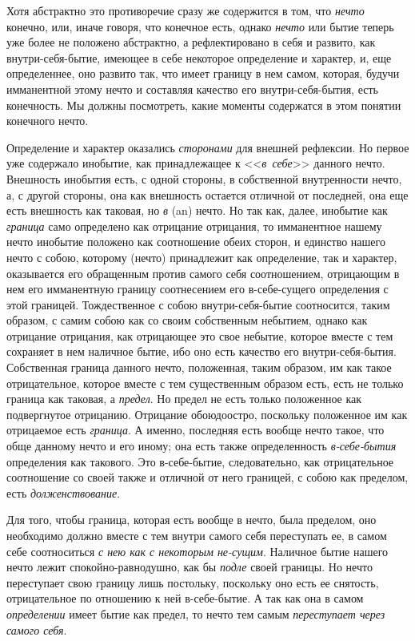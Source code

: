 \bigskip


Хотя абстрактно это противоречие сразу же содержится в том, что
{\em нечто} конечно, или, иначе говоря, что конечное
есть, однако {\em нечто} или бытие теперь уже более не
положено абстрактно, а рефлектировано в себя и развито, как
внутри-себя-бытие, имеющее в себе некоторое определение и характер, и, еще
определеннее, оно развито так, что имеет границу в нем самом, которая,
будучи имманентной этому нечто и составляя качество его внутри-себя-бытия,
есть конечность. Мы должны посмотреть, какие моменты содержатся в этом
понятии конечного нечто.

Определение и характер оказались {\em сторонами} для
внешней рефлексии. Но первое уже содержало инобытие, как принадлежащее к
<<{\em в~себе}>> данного нечто. Внешность инобытия есть,
с одной стороны, в собственной внутренности нечто, а, с другой стороны, она
как внешность остается отличной от последней, она еще есть внешность как
таковая, но {\em в} (an) нечто. Но так как, далее,
инобытие как {\em граница} само определено как
отрицание отрицания, то имманентное нашему нечто инобытие положено как
соотношение обеих сторон, и единство нашего нечто с собою, которому (нечто)
принадлежит как определение, так и характер, оказывается его обращенным
против самого себя соотношением, отрицающим в нем его имманентную границу
соотнесением его в-себе-сущего определения с этой границей. Тождественное с
собою внутри-себя-бытие соотносится, таким образом, с самим собою как со
своим собственным небытием, однако как отрицание отрицания, как отрицающее
это свое небытие, которое вместе с тем сохраняет в нем наличное бытие, ибо
оно есть качество его внутри-себя-бытия. Собственная граница данного нечто,
положенная, таким образом, им как такое отрицательное, которое вместе с тем
существенным образом есть, есть не только граница как таковая, а
{\em предел}. Но предел не есть только положенное как
подвергнутое отрицанию. Отрицание обоюдоостро, поскольку положенное им как
отрицаемое есть {\em граница}. А именно, последняя есть
вообще нечто такое, что обще данному нечто и его иному; она есть также
определенность {\em в-себе-бытия} определения как
такового. Это в-себе-бытие, следовательно, как отрицательное соотношение со
своей также и отличной от него границей, с собою как пределом, есть
{\em долженствование}.

Для того, чтобы граница, которая есть вообще в нечто, была пределом, оно
необходимо должно вместе с тем внутри самого себя переступать ее, в самом
себе соотноситься {\em с нею как с некоторым не-сущим}.
Наличное бытие нашего нечто лежит спокойно-равнодушно, как бы
{\em подле} своей границы. Но нечто переступает свою
границу лишь постольку, поскольку оно есть ее снятость, отрицательное по
отношению к ней в-себе-бытие. А так как она в самом
{\em определении} имеет бытие как предел, то нечто тем
самым {\em переступает через самого себя}.


